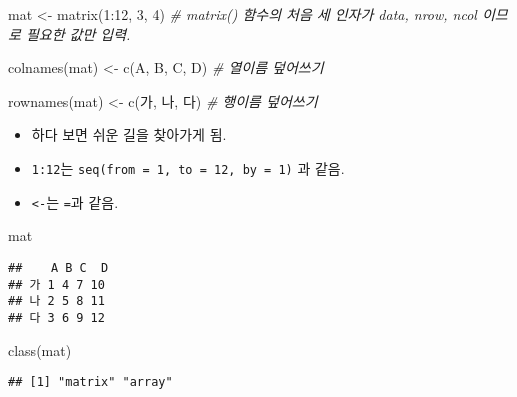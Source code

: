 \documentclass[
  12,
]{article}
\newenvironment{Shaded}{\begin{snugshade}}{\end{snugshade}}
\newcommand{\CommentTok}[1]{\textcolor[rgb]{0.56,0.35,0.01}{\textit{#1}}}
\newcommand{\DecValTok}[1]{\textcolor[rgb]{0.00,0.00,0.81}{#1}}
\newcommand{\FunctionTok}[1]{\textcolor[rgb]{0.00,0.00,0.00}{#1}}
\newcommand{\NormalTok}[1]{#1}
\newcommand{\OtherTok}[1]{\textcolor[rgb]{0.56,0.35,0.01}{#1}}
\newcommand{\SpecialCharTok}[1]{\textcolor[rgb]{0.00,0.00,0.00}{#1}}
\newcommand{\StringTok}[1]{\textcolor[rgb]{0.31,0.60,0.02}{#1}}
\begin{document}
\begin{Shaded}
\begin{Highlighting}[]
\NormalTok{mat }\OtherTok{\textless{}{-}} \FunctionTok{matrix}\NormalTok{(}\DecValTok{1}\SpecialCharTok{:}\DecValTok{12}\NormalTok{, }\DecValTok{3}\NormalTok{, }\DecValTok{4}\NormalTok{) }\CommentTok{\# matrix() 함수의 처음 세 인자가 data, nrow, ncol 이므로 필요한 값만 입력.}

\FunctionTok{colnames}\NormalTok{(mat) }\OtherTok{\textless{}{-}} \FunctionTok{c}\NormalTok{(}\StringTok{\textquotesingle{}A\textquotesingle{}}\NormalTok{, }\StringTok{\textquotesingle{}B\textquotesingle{}}\NormalTok{, }\StringTok{\textquotesingle{}C\textquotesingle{}}\NormalTok{, }\StringTok{\textquotesingle{}D\textquotesingle{}}\NormalTok{) }\CommentTok{\# 열이름 덮어쓰기}

\FunctionTok{rownames}\NormalTok{(mat) }\OtherTok{\textless{}{-}} \FunctionTok{c}\NormalTok{(}\StringTok{\textquotesingle{}가\textquotesingle{}}\NormalTok{, }\StringTok{\textquotesingle{}나\textquotesingle{}}\NormalTok{, }\StringTok{\textquotesingle{}다\textquotesingle{}}\NormalTok{) }\CommentTok{\# 행이름 덮어쓰기}
\end{Highlighting}
\end{Shaded}

\begin{itemize}
\item
  하다 보면 쉬운 길을 찾아가게 됨.
\item
  \texttt{1:12}는 \texttt{seq(from\ =\ 1,\ to\ =\ 12,\ by\ =\ 1)} 과
  같음.
\item
  \texttt{\textless{}-}는 \texttt{=}과 같음.
\end{itemize}

\begin{Shaded}
\begin{Highlighting}[]
\NormalTok{mat}
\end{Highlighting}
\end{Shaded}

\begin{verbatim}
##    A B C  D
## 가 1 4 7 10
## 나 2 5 8 11
## 다 3 6 9 12
\end{verbatim}

\begin{Shaded}
\begin{Highlighting}[]
\FunctionTok{class}\NormalTok{(mat)}
\end{Highlighting}
\end{Shaded}

\begin{verbatim}
## [1] "matrix" "array"
\end{verbatim}
\end{document}
